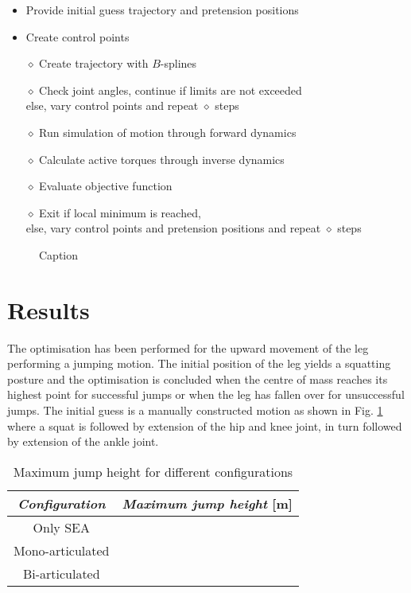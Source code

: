 \documentclass[letterpaper, 10 pt, conference]{ieeeconf}  %
\begin{document}
\begin{itemize}
	\item Provide initial guess trajectory and pretension positions
	\item Create control points\\
	\item[$\diamond$] Create trajectory with $B$-splines
	\item[$\diamond$] Check joint angles, continue if limits are not exceeded \\else, vary control points and repeat $\diamond$ steps
	\item[$\diamond$] Run simulation of motion through forward dynamics
	\item[$\diamond$] Calculate active torques through inverse dynamics
	\item[$\diamond$] Evaluate objective function\\
	\item[$\diamond$] Exit if local minimum is reached, \\ else, vary control points and pretension positions and repeat $\diamond$ steps
\end{itemize}

	





   \begin{figure}[thpb]
      \centering
      \caption{Caption}
      \label{fig:seq}
   \end{figure}
   
\section{Results} \label{sec:results}

The optimisation has been performed for the upward movement of the leg performing a jumping motion. The initial position of the leg yields a squatting posture and the optimisation is concluded when the centre of mass reaches its highest point for successful jumps or when the leg has fallen over for unsuccessful jumps. The initial guess is a manually constructed motion as shown in Fig. \ref{fig:seq} where a squat is followed by extension of the hip and knee joint, in turn followed by extension of the ankle joint.   
\begin{table}[h]
	\caption{Maximum jump height for different configurations}
	\label{maxheight}
	\begin{center}
		\begin{tabular}{c||c}
		\textit{Configuration}	& \textit{Maximum jump height} [m] \\
			\hline
			Only SEA &   \\
			\hline
			Mono-articulated &  \\
			\hline
			Bi-articulated & 
		\end{tabular}
	\end{center}
\end{table}
\end{document}

